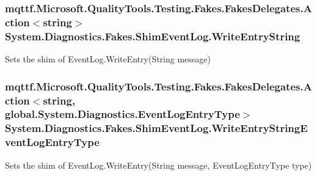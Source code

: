 \hypertarget{class_system_1_1_diagnostics_1_1_fakes_1_1_shim_event_log_a4e60ffed460a805280b9dead3bfdcc54}{
\subsubsection[{Write\-Entry\-String}]{\setlength{\rightskip}{0pt plus 5cm}mqttf.\-Microsoft.\-Quality\-Tools.\-Testing.\-Fakes.\-Fakes\-Delegates.\-Action$<$string$>$ System.\-Diagnostics.\-Fakes.\-Shim\-Event\-Log.\-Write\-Entry\-String\hspace{0.3cm}{\ttfamily [set]}}}\label{class_system_1_1_diagnostics_1_1_fakes_1_1_shim_event_log_a4e60ffed460a805280b9dead3bfdcc54}


Sets the shim of Event\-Log.\-Write\-Entry(\-String message)

\hypertarget{class_system_1_1_diagnostics_1_1_fakes_1_1_shim_event_log_ac33a6ddb8117882662c3bf7c3236af8e}{
\subsubsection[{Write\-Entry\-String\-Event\-Log\-Entry\-Type}]{\setlength{\rightskip}{0pt plus 5cm}mqttf.\-Microsoft.\-Quality\-Tools.\-Testing.\-Fakes.\-Fakes\-Delegates.\-Action$<$string, global.\-System.\-Diagnostics.\-Event\-Log\-Entry\-Type$>$ System.\-Diagnostics.\-Fakes.\-Shim\-Event\-Log.\-Write\-Entry\-String\-Event\-Log\-Entry\-Type\hspace{0.3cm}{\ttfamily [set]}}}\label{class_system_1_1_diagnostics_1_1_fakes_1_1_shim_event_log_ac33a6ddb8117882662c3bf7c3236af8e}


Sets the shim of Event\-Log.\-Write\-Entry(\-String message, Event\-Log\-Entry\-Type type)

